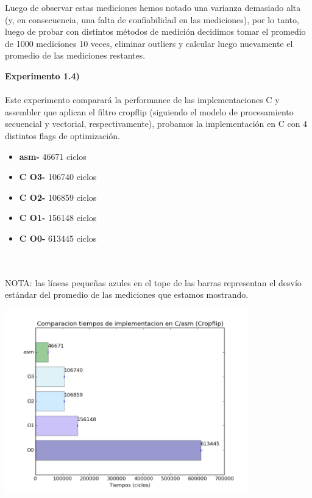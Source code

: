 \documentclass[a4paper]{article}
\begin{document}
Luego de observar estas mediciones hemos notado una varianza demasiado alta (y, en consecuencia, una falta de confiabilidad en las mediciones), por lo tanto, luego de probar con distintos m\'{e}todos de medici\'{o}n decidimos tomar el promedio de 1000 mediciones 10 veces, eliminar outliers y calcular luego nuevamente el promedio de las mediciones restantes.

\newpage

\textbf{Experimento 1.4)}\\ \\

Este experimento comparar\'{a} la performance de las implementaciones C y assembler que aplican el filtro cropflip (siguiendo el modelo de procesamiento secuencial y vectorial, respectivamente), probamos la implementaci\'{o}n en C con 4 distintos flags de optimizaci\'{o}n.

\begin{itemize}

\item \textbf{asm-} 46671 ciclos\\
\item \textbf{C O3-} 106740 ciclos\\
\item \textbf{C O2-} 106859 ciclos\\
\item \textbf{C O1-} 156148 ciclos\\
\item \textbf{C O0-} 613445 ciclos\\ \\ \\

\end{itemize}



NOTA: las l\'{i}neas peque\~nas azules en el tope de las barras representan el desv\'{i}o est\'{a}ndar del promedio de las mediciones que estamos mostrando.

\includegraphics[width=300pt]{imagenes/CompCasm1.png}
\end{document}
